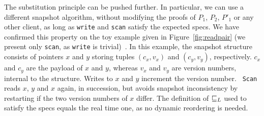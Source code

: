 The substitution principle can be pushed further. In particular, we
can use a different snapshot algorithm, without modifying the proofs
of $P_1$, $P_2$, $P'_1$ or any other client, as long as {\tt write}
and {\tt scan} satisfy the expected specs.
%
We have confirmed this property on the toy example given in
Figure~\ref{fig:readpair} (we present only {\tt scan}, as {\tt write}
is trivial)~\cite{Sergey-al:ESOP15}. In this example, the snapshot
structure consists of pointers $x$ and $y$ storing tuples $(c_x, v_x)$
and $(c_y, v_y)$, respectively. $c_x$ and $c_y$ are the payload of $x$
and $y$, whereas $v_x$ and $v_y$ are version numbers, internal to the
structure. Writes to $x$ and $y$ increment the version number. {\tt
  Scan} reads $x$, $y$ and $x$ again, in succession, but avoids
snapshot inconsistency by restarting if the two version numbers of $x$
differ. The definition of $\mathrel{\sqsubseteq_L}$ used to satisfy the specs equals the
real time one, as no dynamic reordering is needed.


